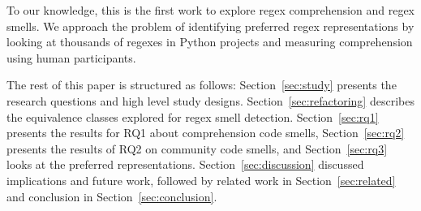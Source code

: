 To our knowledge, this is the first work to explore regex comprehension and regex smells. We approach the problem of identifying preferred regex representations by looking at thousands of regexes in Python projects and measuring comprehension using human participants.  %

The rest of this paper is structured as follows:
Section~\ref{sec:study} presents the research questions and high level study designs.
Section~\ref{sec:refactoring} describes the equivalence classes explored for regex smell detection.
Section~\ref{sec:rq1} presents the results for RQ1 about comprehension code smells,
Section~\ref{sec:rq2} presents the results of RQ2 on community code smells, and
Section~\ref{sec:rq3} looks at the preferred representations.
Section~\ref{sec:discussion} discussed implications and future work, followed by related work in Section~\ref{sec:related} and conclusion in Section~\ref{sec:conclusion}.
%
